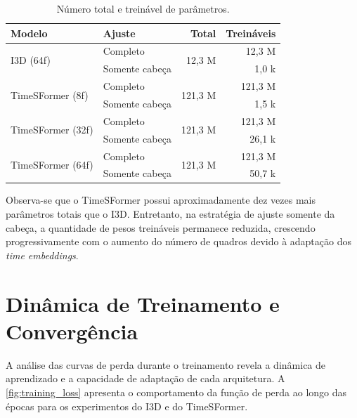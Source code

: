 \documentclass[12pt, %
openright, 
oneside, %
a4paper,    %
brazil]{facom-ufu-abntex2}
\begin{document}
\begin{table}[!htp]
\centering
\caption{Número total e treinável de parâmetros.}
\label{tab:params}
\renewcommand{\arraystretch}{0.95} 
\begin{tabular}{llrr}
\toprule
\textbf{Modelo} & \textbf{Ajuste} & \textbf{Total} & \textbf{Treináveis} \\
\midrule

\multirow{2}{*}{I3D (64f)}
& Completo         & \multirow{2}{*}{12,3 M} & 12,3 M \\
& Somente cabeça   &                         & 1,0 k \\

\midrule

\multirow{2}{*}{TimeSFormer (8f)}
& Completo         & \multirow{2}{*}{121,3 M} & 121,3 M \\
& Somente cabeça   &                          & 1,5 k \\

\midrule

\multirow{2}{*}{TimeSFormer (32f)}
& Completo         & \multirow{2}{*}{121,3 M} & 121,3 M \\
& Somente cabeça   &                          & 26,1 k \\

\midrule

\multirow{2}{*}{TimeSFormer (64f)}
& Completo         & \multirow{2}{*}{121,3 M} & 121,3 M \\
& Somente cabeça   &                          & 50,7 k \\

\bottomrule
\end{tabular}
\end{table}

Observa-se que o TimeSFormer possui aproximadamente dez vezes mais parâmetros totais que o I3D. Entretanto, na estratégia de ajuste somente da cabeça, a quantidade de pesos treináveis permanece reduzida, crescendo progressivamente com o aumento do número de quadros devido à adaptação dos \textit{time embeddings}.

\section[Dinâmica de Treinamento e Convergência]{Dinâmica de Treinamento e Convergência}

A análise das curvas de perda durante o treinamento revela a dinâmica de aprendizado e a capacidade de adaptação de cada arquitetura. A \autoref{fig:training_loss} apresenta o comportamento da função de perda ao longo das épocas para os experimentos do I3D e do TimeSFormer.
\end{document}
